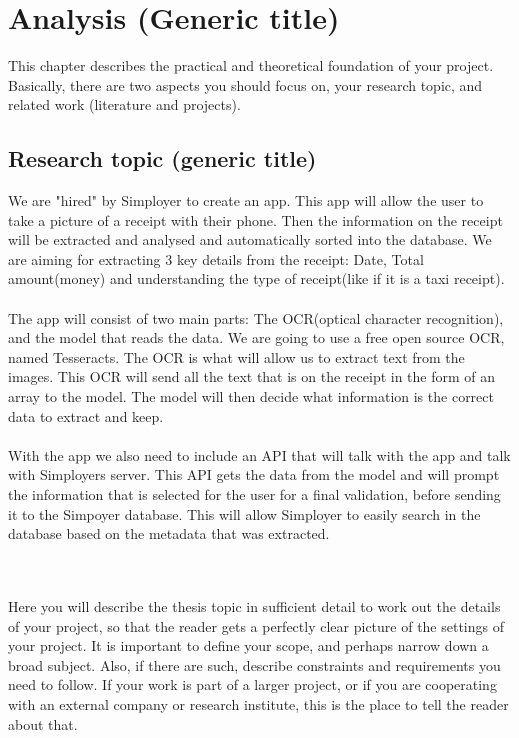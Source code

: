 \cleardoublepage
\chapter{Analysis (Generic title)}
\label{ch:analysis}

This chapter describes the practical and theoretical foundation of your project.
Basically, there are two aspects you should focus on, your research topic, and related work (literature and projects).

\section{Research topic (generic title)}\label{sec:research-topic-(generic-title)}

We are "hired" by Simployer to create an app.
This app will allow the user to take a picture of a receipt with their phone.
Then the information on the receipt will be extracted and analysed and automatically sorted into the database.
We are aiming for extracting 3 key details from the receipt: Date, Total amount(money) and understanding the type of receipt(like if it is a taxi receipt).
\\\\
The app will consist of two main parts: The OCR(optical character recognition), and the model that reads the data.
We are going to use a free open source OCR, named Tesseracts.
The OCR is what will allow us to extract text from the images.
This OCR will send all the text that is on the receipt in the form of an array to the model.
The model will then decide what information is the correct data to extract and keep.
\\\\
With the app we also need to include an API that will talk with the app and talk with Simployers server.
This API gets the data from the model and will prompt the information that is selected for the user for a final validation, before sending it to the Simpoyer database.
This will allow Simployer to easily search in the database based on the metadata that was extracted.

\\\\
Here you will describe the thesis topic in sufficient detail to work out the details of your project, so that the reader gets a perfectly clear picture of the settings of your project.
It is important to define your scope, and perhaps narrow down a broad subject.
Also, if there are such, describe constraints and requirements you need to follow.
If your work is part of a larger project, or if you are cooperating with an external company or research institute, this is the place to tell the reader about that.


